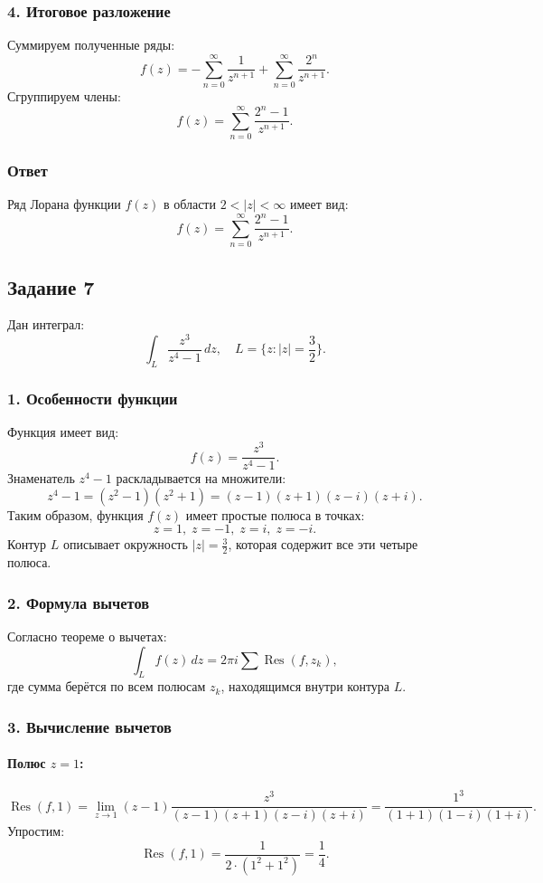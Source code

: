 \documentclass[a4paper,12pt]{article}
\begin{document}
\subsubsection*{4. Итоговое разложение}
Суммируем полученные ряды:
\[
f(z) = -\sum_{n=0}^\infty \frac{1}{z^{n+1}} + \sum_{n=0}^\infty \frac{2^n}{z^{n+1}}.
\]
Сгруппируем члены:
\[
f(z) = \sum_{n=0}^\infty \frac{2^n - 1}{z^{n+1}}.
\]

\subsubsection*{Ответ}
Ряд Лорана функции \( f(z) \) в области \( 2 < |z| < \infty \) имеет вид:
\[
f(z) = \sum_{n=0}^\infty \frac{2^n - 1}{z^{n+1}}.
\]

\subsection*{Задание 7}

Дан интеграл:
\[
\int_L \frac{z^3}{z^4 - 1} \, dz, \quad L = \{z : |z| = \frac{3}{2}\}.
\]

\subsubsection*{1. Особенности функции}
Функция имеет вид:
\[
f(z) = \frac{z^3}{z^4 - 1}.
\]
Знаменатель \( z^4 - 1 \) раскладывается на множители:
\[
z^4 - 1 = (z^2 - 1)(z^2 + 1) = (z - 1)(z + 1)(z - i)(z + i).
\]
Таким образом, функция \( f(z) \) имеет простые полюса в точках:
\[
z = 1, \; z = -1, \; z = i, \; z = -i.
\]
Контур \( L \) описывает окружность \( |z| = \frac{3}{2} \), которая содержит все эти четыре полюса.

\subsubsection*{2. Формула вычетов}
Согласно теореме о вычетах:
\[
\int_L f(z) \, dz = 2\pi i \sum \operatorname{Res}(f, z_k),
\]
где сумма берётся по всем полюсам \( z_k \), находящимся внутри контура \( L \).

\subsubsection*{3. Вычисление вычетов}

\paragraph{Полюс \( z = 1 \):}
\[
\operatorname{Res}(f, 1) = \lim_{z \to 1} (z - 1) \frac{z^3}{(z - 1)(z + 1)(z - i)(z + i)} = \frac{1^3}{(1 + 1)(1 - i)(1 + i)}.
\]
Упростим:
\[
\operatorname{Res}(f, 1) = \frac{1}{2 \cdot (1^2 + 1^2)} = \frac{1}{4}.
\]
\end{document}
